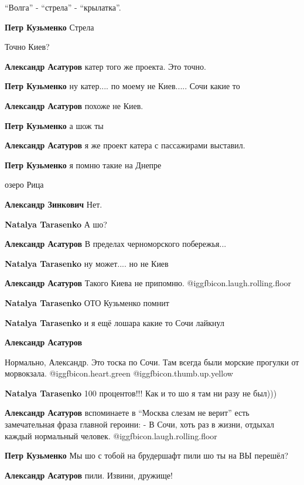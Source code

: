  
 
 
 
 

\enquote{Волга} - \enquote{стрела} - \enquote{крылатка}.

\textbf{Петр Кузьменко} Стрела

Точно Киев?

\textbf{Александр Асатуров} катер того же проекта. Это точно.

\textbf{Петр Кузьменко} ну катер.... по моему не Киев..... Сочи какие то

\textbf{Александр Асатуров} похоже не Киев.

\textbf{Петр Кузьменко} а шож ты

\textbf{Александр Асатуров} я же проект катера с пассажирами выставил.

\textbf{Петр Кузьменко} я помню такие на Днепре

озеро Рица

\textbf{Александр Зинкович} Нет.

\textbf{Natalya Tarasenko} А шо?

\textbf{Александр Асатуров} В пределах черноморского побережья...

\textbf{Natalya Tarasenko} ну может.... но не Киев

\textbf{Александр Асатуров} Такого Киева не припомню. @igg{fbicon.laugh.rolling.floor} 

\textbf{Natalya Tarasenko} ОТО Кузьменко помнит

\textbf{Natalya Tarasenko} и я ещё лошара какие то Сочи лайкнул

\textbf{Александр Асатуров} 

Нормально, Александр. Это тоска по Сочи. Там всегда были морские прогулки от
морвокзала.  @igg{fbicon.heart.green}  @igg{fbicon.thumb.up.yellow} 

\textbf{Natalya Tarasenko} 100 процентов!!! Как и то шо я там ни разу не был)))

\textbf{Александр Асатуров} вспоминаете в \enquote{Москва слезам не верит} есть замечательная фраза главной героини: - В Сочи, хоть раз в жизни, отдыхал каждый нормальный человек. @igg{fbicon.laugh.rolling.floor} 

\textbf{Петр Кузьменко} Мы шо с тобой на брудершафт пили шо ты на ВЫ перешёл?

\textbf{Александр Асатуров} пили. Извини, дружище!
